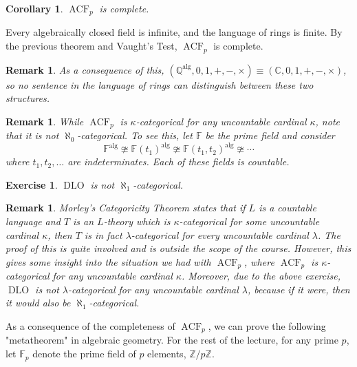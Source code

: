 \documentclass[10pt]{article}
\makeatletter
\newcommand{\C}{\mathbb{C}}
\newcommand{\Z}{\mathbb{Z}}
\newcommand{\Q}{\mathbb{Q}}
\newcommand{\F}{\mathbb{F}}
\DeclareMathOperator{\ACF}{ACF}
\DeclareMathOperator{\DLO}{DLO}
\DeclareMathOperator{\alg}{alg}
\theoremstyle{newstyle}
\newtheorem{cor}[thm]{Corollary}
\newtheorem{remark}[thm]{Remark}
\newtheorem{exercise}[thm]{Exercise}
\newenvironment{pf}[1][\proofname]{\par
  \pushQED{\qed}%
  \normalfont \topsep0\p@\relax
  \trivlist
  \item[\hskip\labelsep\scshape
  #1\@addpunct{.}]\ignorespaces
}{%
  \popQED\endtrivlist\@endpefalse
}
\makeatother
\begin{document}
\begin{cor}
$\ACF_p$ is complete.
\end{cor}
\begin{pf}
Every algebraically closed field is infinite, and the language of rings is 
finite. By the previous theorem and Vaught's Test, $\ACF_p$ is complete.
\end{pf}

\begin{remark}
As a consequence of this, $(\Q^{\alg}, 0, 1, +, -, \times) \equiv (\C, 0, 1, +, -, \times)$, so no sentence in the language of rings can distinguish 
between these two structures.
\end{remark}

\begin{remark}
While $\ACF_p$ is $\kappa$-categorical for any uncountable cardinal 
$\kappa$, note that it is not $\aleph_0$-categorical. To see this, let $\F$ be the prime field
and consider 
\[ \F^{\alg} \ncong \F(t_1)^{\alg} \ncong \F(t_1, t_2)^{\alg} \ncong \cdots \]
where $t_1, t_2, \dots$ are indeterminates. Each of these fields is countable.
\end{remark}

\begin{exercise}
$\DLO$ is not $\aleph_1$-categorical.
\end{exercise}

\begin{remark}
Morley's Categoricity Theorem states that if $L$ is a countable language and 
$T$ is an $L$-theory which is $\kappa$-categorical for some uncountable cardinal $\kappa$, then 
$T$ is in fact $\lambda$-categorical for every uncountable cardinal $\lambda$. The proof of this 
is quite involved and is outside the scope of the course. However, this gives some insight into the
situation we had with $\ACF_p$, where $\ACF_p$ is $\kappa$-categorical for any 
uncountable cardinal $\kappa$. Moreover, due to the above exercise, $\DLO$ is not $\lambda$-categorical
for any uncountable cardinal $\lambda$, because if it were, then it would also be 
$\aleph_1$-categorical. 
\end{remark}

As a consequence of the completeness of $\ACF_p$, we can prove the following 
"metatheorem" in algebraic geometry. For the rest of the lecture, for any prime $p$, 
let $\F_p$ denote the prime field of $p$ elements, $\Z/p\Z$. 
\end{document}
